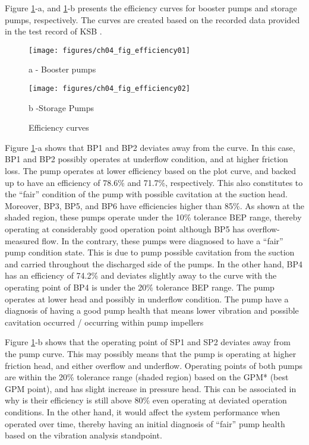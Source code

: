 Figure \ref{ch04_efficiencycurves}-a, and \ref{ch04_efficiencycurves}-b presents the efficiency curves for booster pumps and storage pumps, respectively. The curves are created based on the recorded data provided in the test record of KSB \cite{KSB2010}. 


\begin{figure}[!htb]
	\begin{minipage}[b]{0.5\linewidth}
		\centering
		\texttt{[image: figures/ch04\_fig\_efficiency01]}
		\caption*{a - Booster pumps}%
	\end{minipage}
	\hspace{0.05cm}
	\begin{minipage}[b]{0.5\linewidth}
		\centering
		\texttt{[image: figures/ch04\_fig\_efficiency02]}
		\caption*{b -Storage Pumps} %
	\end{minipage}
		\caption{Efficiency curves}
		\label{ch04_efficiencycurves}
\end{figure}

Figure \ref{ch04_efficiencycurves}-a shows that BP1 and BP2 deviates away from the curve. In this case, BP1 and BP2 possibly operates at underflow condition, and at higher friction loss. The pump operates at lower efficiency based on the plot curve, and backed up to have an efficiency of 78.6\% and 71.7\%, respectively. This also constitutes to the “fair” condition of the pump with possible cavitation at the suction head. Moreover, BP3, BP5, and BP6 have efficiencies higher than 85\%. As shown at the shaded region, these pumps operate under the 10\% tolerance BEP range, thereby operating at considerably good operation point although BP5 has overflow-measured flow. In the contrary, these pumps were diagnosed to have a “fair” pump condition state. This is due to pump possible cavitation from the suction and carried throughout the discharged side of the pumps. In the other hand, BP4 has an efficiency of 74.2\% and deviates slightly away to the curve with the operating point of BP4 is under the 20\% tolerance BEP range. The pump operates at lower head and possibly in underflow condition. The pump have a diagnosis of having a good pump health that means lower vibration and possible cavitation occurred / occurring within pump impellers

Figure \ref{ch04_efficiencycurves}-b shows that the operating point of SP1 and SP2 deviates away from the pump curve. This may possibly means that the pump is operating at higher friction head, and either overflow and underflow. Operating points of both pumps are within the 20\% tolerance range (shaded region) based on the GPM* (best GPM point), and has slight increase in pressure head. This can be associated in why is their efficiency is still above 80\% even operating at deviated operation conditions. In the other hand, it would affect the system performance when operated over time, thereby having an initial diagnosis of “fair” pump health based on the vibration analysis standpoint. 


